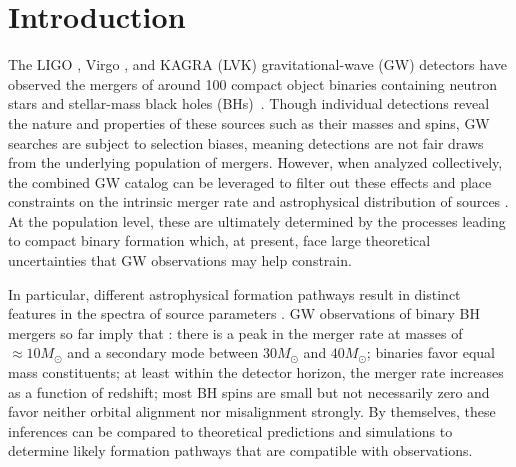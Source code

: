 \documentclass[%
reprint,
 amsmath,amssymb,
 aps,
 prd,nofootinbib,nobibnotes,
 superscriptaddress,groupedaddress,
]{revtex4-2}
\begin{document}
\section{Introduction}

The LIGO \cite{LIGOScientific:2014pky}, Virgo \cite{VIRGO:2014yos}, and KAGRA \cite{KAGRA:2020tym} (LVK) gravitational-wave (GW) detectors have observed the mergers of around 100 compact object binaries containing neutron stars and stellar-mass black holes (BHs)~\cite{LIGOScientific:2018mvr,LIGOScientific:2020ibl,LIGOScientific:2021usb,KAGRA:2021vkt}. Though individual detections reveal the nature and properties of these sources such as their masses and spins, GW searches are subject to selection biases, meaning detections are not fair draws from the underlying population of mergers. However, when analyzed collectively, the combined GW catalog can be leveraged to filter out these effects and place constraints on the intrinsic merger rate and astrophysical distribution of sources \cite{Mandel:2018mve, Thrane:2018qnx, Vitale2020, Essick:2023upv}. At the population level, these are ultimately determined by the processes leading to compact binary formation which, at present, face large theoretical uncertainties that GW observations may help constrain.

In particular, different astrophysical formation pathways result in distinct features in the spectra of source parameters \cite{Mandel:2018hfr, Mandel:2021smh, Mapelli:2021taw, Bavera:2020uch, Bavera:2022mef, Zevin:2020gbd, Zevin:2022wrw, Broekgaarden:2022nst, Fuller:2019sxi, Bavera:2020inc, Fuller:2022ysb, Barkat:1967zz, Woosley:2016hmi, Tanikawa:2021zfm, Gerosa:2021mno}. GW observations of binary BH mergers so far imply that \cite{LIGOScientific:2018jsj, LIGOScientific:2020kqk, KAGRA:2021duu}: there is a peak in the merger rate at masses of $\approx10M_\odot$ and a secondary mode between $30M_\odot$ and $40M_\odot$; binaries favor equal mass constituents; at least within the detector horizon, the merger rate increases as a function of redshift; most BH spins are small but not necessarily zero and favor neither orbital alignment nor misalignment strongly. By themselves, these inferences can be compared to theoretical predictions and simulations to determine likely formation pathways that are compatible with observations.
\end{document}

